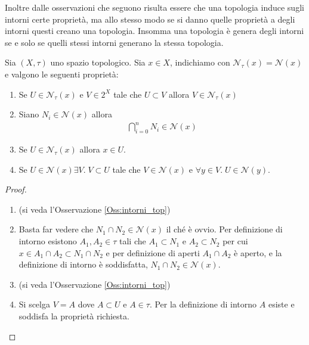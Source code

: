 Inoltre dalle osservazioni che seguono risulta essere che una topologia induce sugli intorni certe proprietà, ma allo stesso modo se si danno quelle proprietà a degli intorni questi creano una topologia. Insomma una topologia è genera degli intorni se e solo se quelli stessi intorni generano la stessa topologia. 

\begin{proposition}
	Sia $(X,\tau)$ uno spazio topologico. Sia $x \in X$, indichiamo con $\mathcal{N}_\tau(x) = \mathcal{N}(x)$ e valgono le seguenti proprietà:
	\begin{enumerate}
		\item Se $U \in \mathcal{N}_\tau(x)$ e $V \in 2^X$ tale che $U \subset V$ allora $V \in \mathcal{N}_\tau(x)$
		\item Siano $N_i \in \mathcal{N}(x)$ allora 
		\begin{equation}
		\begin{aligned}
			\bigcap^{n}_{i=0} N_i \in \mathcal{N}(x)
		\end{aligned}
		\end{equation}
		\item Se $U \in \mathcal{N}_\tau(x)$ allora $x \in U$. 
		\item Se $U \in \mathcal{N}(x) \exists V . \; V \subset U$ tale che $V \in \mathcal{N}(x)$ e $\forall y \in V. \; U \in \mathcal{N}(y)$.
	\end{enumerate}
\end{proposition}
\begin{proof}
	\begin{enumerate}
		\item  (si veda l'Osservazione \ref{Oss:intorni_top})
		\item Basta far vedere che $N_1 \cap N_2 \in \mathcal{N}(x)$ il ché è ovvio. Per definizione di intorno esistono $A_1, A_2 \in \tau$ tali che $A_1 \subset N_1$ e $A_2 \subset N_2$ per cui $x \in A_1 \cap A_2 \subset N_1 \cap N_2$ e per definizione di aperti $A_1 \cap A_2$ è aperto, e la definizione di intorno è soddisfatta, $N_1 \cap N_2 \in \mathcal{N}(x)$.
		\item  (si veda l'Osservazione \ref{Oss:intorni_top})
		\item Si scelga $V = A$ dove $A \subset U$ e $A \in \tau$. Per la definizione di intorno $A$ esiste e soddisfa la proprietà richiesta. 
	\end{enumerate}
\end{proof}  

